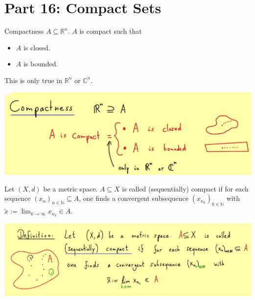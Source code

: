 \documentclass[../../note.tex]{subfiles}
\begin{document}
\section{Part 16: Compact Sets}
\begin{example}
    Compactness $A \subseteq \mathbb{R}^n$. $A$ is compact such that 
    \begin{itemize}
        \item $A$ is closed. 
        \item $A$ is bounded.
    \end{itemize}
    This is only true in $\mathbb{R}^n$ or $\mathbb{C}^n$.
\end{example}
\includegraphics[scale = 0.3]{../figures/compactness.png}

\begin{definition}
    Let $(X,d)$ be a metric space. $A \subseteq X$ is called (sequentially) compact if for each sequence $(x_n)_{n \in \mathbb{N}} \subseteq A$, one finds a convergent subsequence $(x_{n_k})_{k \in \mathbb{N}}$ with $\tilde{x}:= \lim_{k \rightarrow \infty} x_{n_k} \in A$.
\end{definition}
\includegraphics[scale = 0.2]{../figures/Sequentially compact.png}
\end{document}
